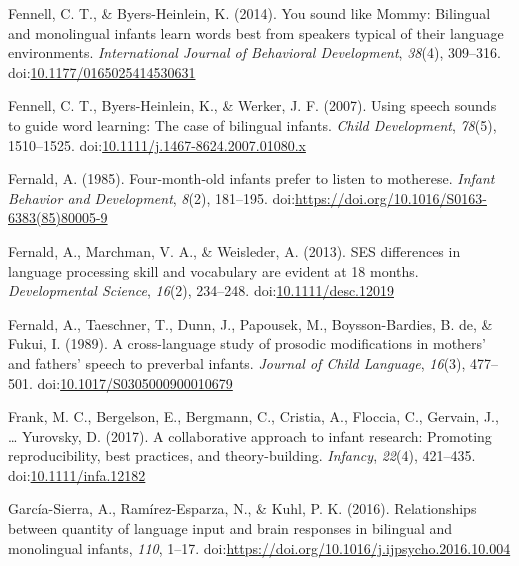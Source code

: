 \documentclass[,man,floatsintext]{apa6}
\begin{document}
\leavevmode\hypertarget{ref-fennell_2014}{}%
Fennell, C. T., \& Byers-Heinlein, K. (2014). You sound like Mommy: Bilingual and monolingual infants learn words best from speakers typical of their language environments. \emph{International Journal of Behavioral Development}, \emph{38}(4), 309--316. doi:\href{https://doi.org/10.1177/0165025414530631}{10.1177/0165025414530631}

\leavevmode\hypertarget{ref-fennell_2007}{}%
Fennell, C. T., Byers-Heinlein, K., \& Werker, J. F. (2007). Using speech sounds to guide word learning: The case of bilingual infants. \emph{Child Development}, \emph{78}(5), 1510--1525. doi:\href{https://doi.org/10.1111/j.1467-8624.2007.01080.x}{10.1111/j.1467-8624.2007.01080.x}

\leavevmode\hypertarget{ref-fernald_1985}{}%
Fernald, A. (1985). Four-month-old infants prefer to listen to motherese. \emph{Infant Behavior and Development}, \emph{8}(2), 181--195. doi:\href{https://doi.org/https://doi.org/10.1016/S0163-6383(85)80005-9}{https://doi.org/10.1016/S0163-6383(85)80005-9}

\leavevmode\hypertarget{ref-fernald_2013}{}%
Fernald, A., Marchman, V. A., \& Weisleder, A. (2013). SES differences in language processing skill and vocabulary are evident at 18 months. \emph{Developmental Science}, \emph{16}(2), 234--248. doi:\href{https://doi.org/10.1111/desc.12019}{10.1111/desc.12019}

\leavevmode\hypertarget{ref-fernald_1989}{}%
Fernald, A., Taeschner, T., Dunn, J., Papousek, M., Boysson-Bardies, B. de, \& Fukui, I. (1989). A cross-language study of prosodic modifications in mothers' and fathers' speech to preverbal infants. \emph{Journal of Child Language}, \emph{16}(3), 477--501. doi:\href{https://doi.org/10.1017/S0305000900010679}{10.1017/S0305000900010679}

\leavevmode\hypertarget{ref-frank_2017}{}%
Frank, M. C., Bergelson, E., Bergmann, C., Cristia, A., Floccia, C., Gervain, J., \ldots{} Yurovsky, D. (2017). A collaborative approach to infant research: Promoting reproducibility, best practices, and theory-building. \emph{Infancy}, \emph{22}(4), 421--435. doi:\href{https://doi.org/10.1111/infa.12182}{10.1111/infa.12182}

\leavevmode\hypertarget{ref-garcia_sierra_2016}{}%
García-Sierra, A., Ramírez-Esparza, N., \& Kuhl, P. K. (2016). Relationships between quantity of language input and brain responses in bilingual and monolingual infants, \emph{110}, 1--17. doi:\href{https://doi.org/https://doi.org/10.1016/j.ijpsycho.2016.10.004}{https://doi.org/10.1016/j.ijpsycho.2016.10.004}
\end{document}
